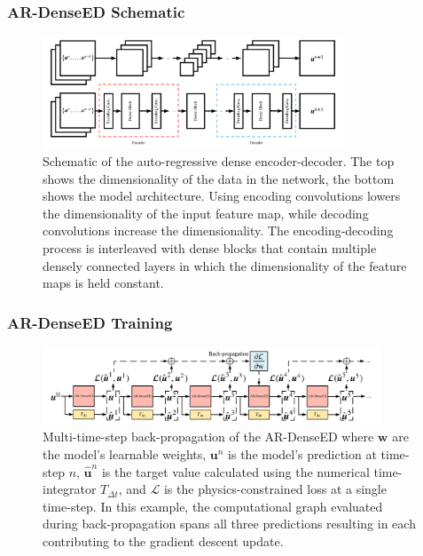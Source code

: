 \documentclass{beamer}
\theoremstyle{remark}
\begin{document}
\begin{frame}
\frametitle{AR-DenseED Schematic}
\begin{figure}[H]
    \centering
    \includegraphics[trim={0 0.25cm 0 0},clip, width=0.8\textwidth]{Fig01.png}
    \caption{Schematic of the auto-regressive dense encoder-decoder.     
    The top shows the dimensionality of the data in the network, the bottom shows the model architecture.
    Using encoding convolutions lowers the dimensionality of the input feature map, while decoding convolutions increase the dimensionality.
    The encoding-decoding process is interleaved with dense blocks that contain multiple densely connected layers in which the dimensionality of the feature maps is held constant.}
    \label{fig:ar-denseED}
\end{figure}
\end{frame}

\begin{frame}
\frametitle{AR-DenseED Training}
\begin{figure}[H]
    \centering
    \includegraphics[width=0.9\textwidth]{Fig03.png}
    \caption{Multi-time-step back-propagation of the AR-DenseED where $\textbf{w}$ are the model's learnable weights, $\bm{u}^{n}$ is the model's prediction at time-step $n$, $\hat{\bm{u}}^{n}$ is the target value calculated using the numerical time-integrator $T_{\Delta t}$, and $\mathcal{L}$ is the physics-constrained loss at a single time-step.
    In this example, the computational graph evaluated during back-propagation spans all three predictions resulting in each contributing to the gradient descent update.}
    \label{fig:multi-backprop}
\end{figure}

\end{frame}
\end{document}
